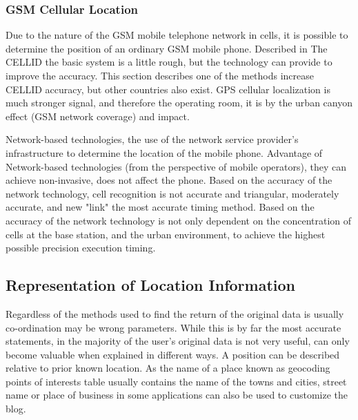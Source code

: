 \documentclass[12pt,a4paper]{article}
\begin{document}
\subsubsection{GSM Cellular Location} %
\label{ssub:gsm_cellular_location}
Due to the nature of the GSM mobile telephone network in cells, it is possible to determine the position of an ordinary GSM mobile phone. Described in The CELLID the basic system is a little rough, but the technology can provide to improve the accuracy. This section describes one of the methods increase CELLID accuracy, but other countries also exist. GPS cellular localization is much stronger signal, and therefore the operating room, it is by the urban canyon effect (GSM network coverage) and impact. \cite{DRoza:2003wz}

Network-based technologies, the use of the network service provider's infrastructure to determine the location of the mobile phone. Advantage of Network-based technologies (from the perspective of mobile operators), they can achieve non-invasive, does not affect the phone. Based on the accuracy of the network technology, cell recognition is not accurate and triangular, moderately accurate, and new "link" the most accurate timing method. Based on the accuracy of the network technology is not only dependent on the concentration of cells at the base station, and the urban environment, to achieve the highest possible precision execution timing. \cite{wiki-cellloc}


\subsection{Representation of Location Information} %
\label{sub:representation_of_location_information}
Regardless of the methods used to find the return of the original data is usually co-ordination may be wrong parameters. While this is by far the most accurate statements, in the majority of the user's original data is not very useful, can only become valuable when explained in different ways. A position can be described relative to prior known location. As the name of a place known as geocoding points of interests table usually contains the name of the towns and cities, street name or place of business in some applications can also be used to customize the blog. \cite{DRoza:2003wz}

\end{document}
